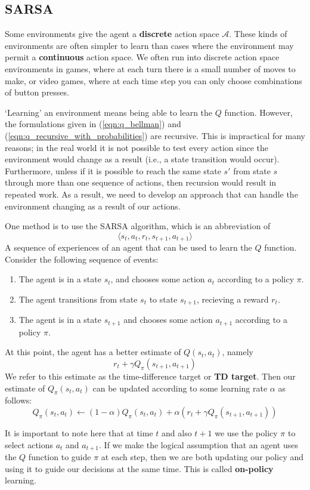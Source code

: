\documentclass[journal, onecolumn, 12pt, draftclsnofoot]{IEEEtran}
\numberwithin{equation}{section}
\newcommand{\kword}[1]{\textbf{#1}}
\newcommand{\mc}[1]{\mathcal{#1}}
\begin{document}
		\subsection{SARSA}
		\par Some environments give the agent a \kword{discrete} action space $\mc{A}$. These kinds of environments are often simpler to learn than cases where the environment may permit a \kword{continuous} action space. We often run into discrete action space environments in games, where at each turn there is a small number of moves to make, or video games, where at each time step you can only choose combinations of button presses.
		\par `Learning' an environment means being able to learn the $Q$ function. However, the formulations given in (\ref{eqn:q_bellman}) and (\ref{eqn:q_recursive_with_probabilities}) are recursive. This is impractical for many reasons; in the real world it is not possible to test every action since the environment would change as a result (i.e., a state transition would occur). Furthermore, unless if it is possible to reach the same state $s'$ from state $s$ through more than one sequence of actions, then recursion would result in repeated work. As a result, we need to develop an approach that can handle the environment changing as a result of our actions.
		\par One method is to use the SARSA algorithm, which is an abbreviation of
		$$\langle s_t, a_t, r_t, s_{t+1}, a_{t+1} \rangle$$
		A sequence of experiences of an agent that can be used to learn the $Q$ function. Consider the following sequence of events:
		\begin{enumerate}
			\item The agent is in a state $s_t$, and chooses some action $a_t$ according to a policy $\pi$.
			\item The agent transitions from state $s_t$ to state $s_{t+1}$, recieving a reward $r_t$.
			\item The agent is in a state $s_{t+1}$ and chooses some action $a_{t+1}$ according to a policy $\pi$.
		\end{enumerate}
		At this point, the agent has a better estimate of $Q(s_t, a_t)$, namely
		\begin{equation}
			\label{eqn:td_target}
			r_t + \gamma Q_\pi(s_{t+1}, a_{t+1})
		\end{equation}
		We refer to this estimate as the time-difference target or \kword{TD target}. Then our estimate of $Q_\pi(s_t, a_t)$ can be updated according to some learning rate $\alpha$ as follows:
		\begin{equation}
			\label{eqn:sarsa_update_rule}
			Q_\pi(s_t, a_t) \gets (1 - \alpha) Q_\pi(s_t, a_t) + \alpha (
			r_t + \gamma Q_\pi(s_{t+1}, a_{t+1}))
		\end{equation}
		\par It is important to note here that at time $t$ and also $t+1$ we use the policy $\pi$ to select actions $a_t$ and $a_{t+1}$. If we make the logical assumption that an agent uses the $Q$ function to guide $\pi$ at each step, then we are both updating our policy and using it to guide our decisions at the same time. This is called \kword{on-policy} learning.
\end{document}
